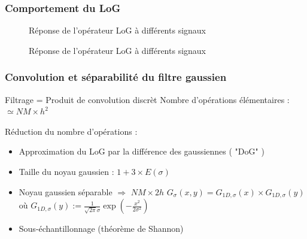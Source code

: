 \documentclass{beamer}
\begin{document}
\begin{frame}
	\frametitle{Comportement du LoG}
	\begin{figure}
		\subfloat[Réponse à un créneau pour $\sigma=1$, $\sigma=2$ et $\sigma=3$]{\scalebox{0.3}{}}
		\caption{Réponse de l'opérateur LoG à différents signaux}
	\end{figure}
\end{frame}

\begin{frame}
	\begin{figure}
		\subfloat[Réponses à des créneaux pour $\sigma=1$]{\scalebox{0.3}{}}
		\caption{Réponse de l'opérateur LoG à différents signaux}
	\end{figure}
\end{frame}

\begin{frame}
	\frametitle{Convolution et séparabilité du filtre gaussien}
	\begin{center}
	Filtrage = Produit de convolution discrèt
	Nombre d'opérations élémentaires : $\simeq NM \times h^{2}$\\
	\end{center}

	Réduction du nombre d'opérations :  
	\begin{itemize}
		\item Approximation du LoG par la différence des gaussiennes ( "DoG" ) 
		\item Taille du noyau gaussien : $1 + 3 \times E(\sigma)$
		\item Noyau gaussien séparable $\Rightarrow$ $NM \times 2h$ 
		$G_{\sigma}(x,y)=G_{1D, \sigma}(x) \times G_{1D, \sigma}(y)$ o\`{u} $G_{1D, \sigma}(y) := \frac{1}{\sqrt{2\pi}\sigma}\exp(-\frac{x^{2}}{2\sigma^{2}})$
		\item Sous-échantillonnage (théorème de Shannon) 
	\end{itemize}

\end{frame}
\end{document}
